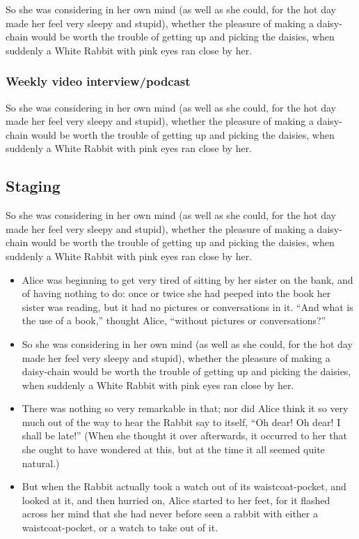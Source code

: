\documentclass[12pt]{article}
\begin{document}
So she was considering in her own mind (as well as she could, for the hot day made her feel very sleepy and stupid), whether the pleasure of making a daisy-chain would be worth the trouble of getting up and picking the daisies, when suddenly a White Rabbit with pink eyes ran close by her. 

\subsubsection{Weekly video interview/podcast}
\label{sec-4-6-4}
So she was considering in her own mind (as well as she could, for the hot day made her feel very sleepy and stupid), whether the pleasure of making a daisy-chain would be worth the trouble of getting up and picking the daisies, when suddenly a White Rabbit with pink eyes ran close by her. 

\subsection{Staging}
\label{sec-4-7}
So she was considering in her own mind (as well as she could, for the hot day made her feel very sleepy and stupid), whether the pleasure of making a daisy-chain would be worth the trouble of getting up and picking the daisies, when suddenly a White Rabbit with pink eyes ran close by her. 

\begin{itemize}
\item Alice was beginning to get very tired of sitting by her sister on the bank, and of having nothing to do: once or twice she had peeped into the book her sister was reading, but it had no pictures or conversations in it. ``And what is the use of a book,'' thought Alice, ``without pictures or conversations?''
\item So she was considering in her own mind (as well as she could, for the hot day made her feel very sleepy and stupid), whether the pleasure of making a daisy-chain would be worth the trouble of getting up and picking the daisies, when suddenly a White Rabbit with pink eyes ran close by her.
\item There was nothing so very remarkable in that; nor did Alice think it so very much out of the way to hear the Rabbit say to itself, ``Oh dear! Oh dear! I shall be late!'' (When she thought it over afterwards, it occurred to her that she ought to have wondered at this, but at the time it all seemed quite natural.)
\item But when the Rabbit actually took a watch out of its waistcoat-pocket, and looked at it, and then hurried on, Alice started to her feet, for it flashed across her mind that she had never before seen a rabbit with either a waistcoat-pocket, or a watch to take out of it.
\end{itemize}
\end{document}
